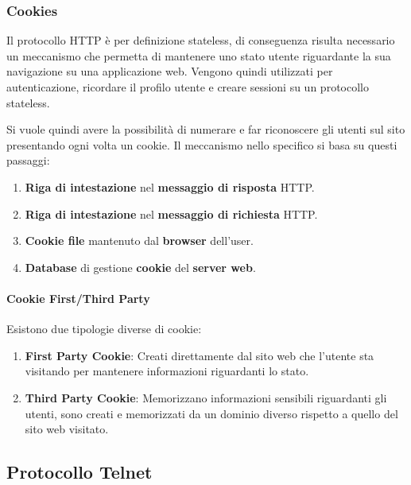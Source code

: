 \documentclass{article}
\begin{document}
\subsubsection{Cookies}

Il protocollo HTTP è per definizione stateless, di conseguenza risulta necessario un meccanismo che permetta di
mantenere uno stato utente riguardante la sua navigazione su una applicazione web. Vengono quindi utilizzati per autenticazione, ricordare il profilo utente e creare sessioni su un protocollo stateless.

\vspace*{10px}

Si vuole quindi avere la possibilità di numerare e far riconoscere gli utenti sul sito presentando ogni volta un cookie.
Il meccanismo nello specifico si basa su questi passaggi:

\begin{enumerate}
    \item \textbf{Riga di intestazione} nel \textbf{messaggio di risposta} HTTP.
    \item \textbf{Riga di intestazione} nel \textbf{messaggio di richiesta} HTTP.
    \item \textbf{Cookie file} mantenuto dal \textbf{browser} dell'user.
    \item \textbf{Database} di gestione \textbf{cookie} del \textbf{server web}.
\end{enumerate}

\newpage

\paragraph{Cookie First/Third Party} Esistono due tipologie diverse di cookie:

\begin{enumerate}
    \item \textbf{First Party Cookie}: Creati direttamente dal sito web che l'utente sta visitando per mantenere informazioni riguardanti lo stato.
    \item \textbf{Third Party Cookie}: Memorizzano informazioni sensibili riguardanti gli utenti, sono creati e memorizzati da un dominio diverso rispetto a quello del sito web visitato.
\end{enumerate}

\subsection{Protocollo Telnet}
\end{document}
